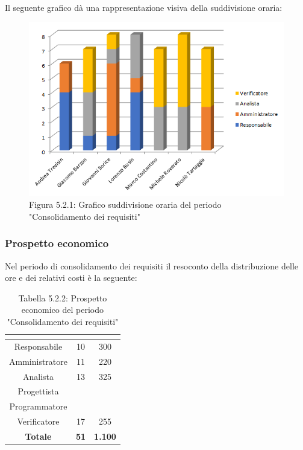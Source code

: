 Il seguente grafico dà una rappresentazione visiva della suddivisione oraria: \\
\begin{figure} [H]
	\centering
	\includegraphics[scale=1]{Res/ExcelGrafici/Grafici/ConsolidamentoOre.png}
	\caption{Figura 5.2.1: Grafico suddivisione oraria del periodo "Consolidamento dei requisiti"}\label{}
\end{figure}


\subsubsection{Prospetto economico}
Nel periodo di consolidamento dei requisiti il resoconto della distribuzione delle ore e dei relativi costi è la seguente:

\renewcommand{\arraystretch}{1.5}
\begin{table}[H]
\begin{center}
\begin{tabular}{|c|c|c|}
\hline
\rowcolor{title_row}
\textbf{\color{title_text}{Ruolo}}  & \textbf{\color{title_text}{Ore}} & \textbf{\color{title_text}{Costo in \euro}} \\ \hline
Responsabile    & 10 & 300 \\ \hline
Amministratore  & 11 & 220 \\ \hline
Analista        & 13 & 325 \\ \hline
Progettista     & & \\ \hline
Programmatore   & & \\ \hline
Verificatore    & 17 & 255 \\ \hline
\textbf{Totale} & \textbf{51}    & \textbf{1.100}    \\ \hline
\end{tabular}
\caption{Tabella 5.2.2: Prospetto economico del periodo "Consolidamento dei requisiti"\label{}}
\end{center}
\end{table}
\renewcommand{\arraystretch}{1}

